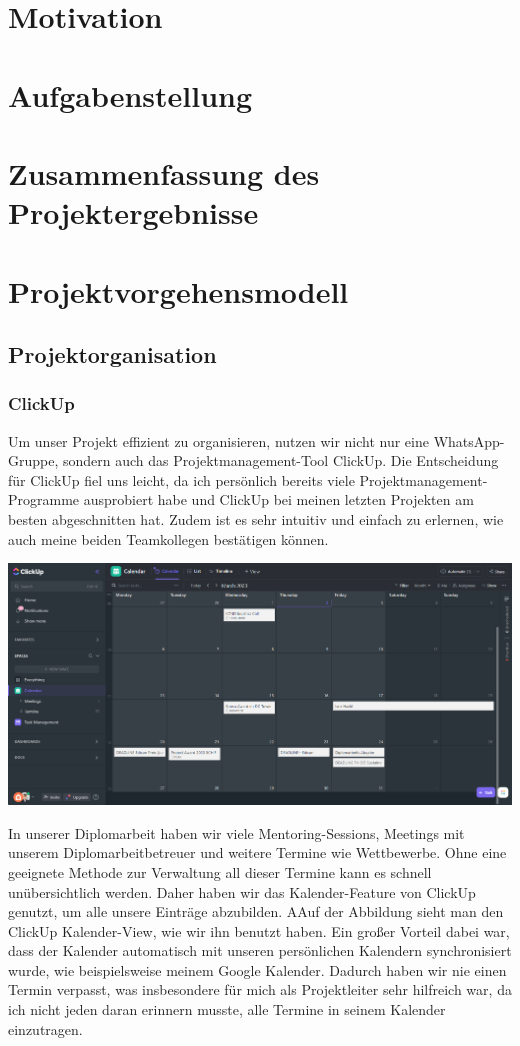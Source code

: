 
\section{Motivation}
\section{Aufgabenstellung}
\section{Zusammenfassung des Projektergebnisse}
\section{Projektvorgehensmodell}
\subsection{Projektorganisation}
\subsubsection{ClickUp}
Um unser Projekt effizient zu organisieren, nutzen wir nicht nur eine WhatsApp-Gruppe, sondern auch das Projektmanagement-Tool ClickUp. Die Entscheidung für ClickUp fiel uns leicht, da ich persönlich bereits viele Projektmanagement-Programme ausprobiert habe und ClickUp bei meinen letzten Projekten am besten abgeschnitten hat. Zudem ist es sehr intuitiv und einfach zu erlernen, wie auch meine beiden Teamkollegen bestätigen können.

\includegraphics[width=1\textwidth]{./pics/clickup-calender-view.png}

In unserer Diplomarbeit haben wir viele Mentoring-Sessions,
Meetings mit unserem Diplomarbeitbetreuer und weitere
Termine wie Wettbewerbe. Ohne eine geeignete Methode zur
Verwaltung all dieser Termine kann es schnell
unübersichtlich werden. Daher haben wir das Kalender-Feature
von ClickUp genutzt, um alle unsere Einträge abzubilden. AAuf der Abbildung sieht man den ClickUp Kalender-View, wie wir ihn benutzt haben. Ein großer Vorteil dabei war, dass der Kalender automatisch
mit unseren persönlichen Kalendern synchronisiert wurde, wie
beispielsweise meinem Google Kalender. Dadurch haben wir nie
einen Termin verpasst, was insbesondere für mich als
Projektleiter sehr hilfreich war, da ich nicht jeden daran
erinnern musste, alle Termine in seinem Kalender
einzutragen.

